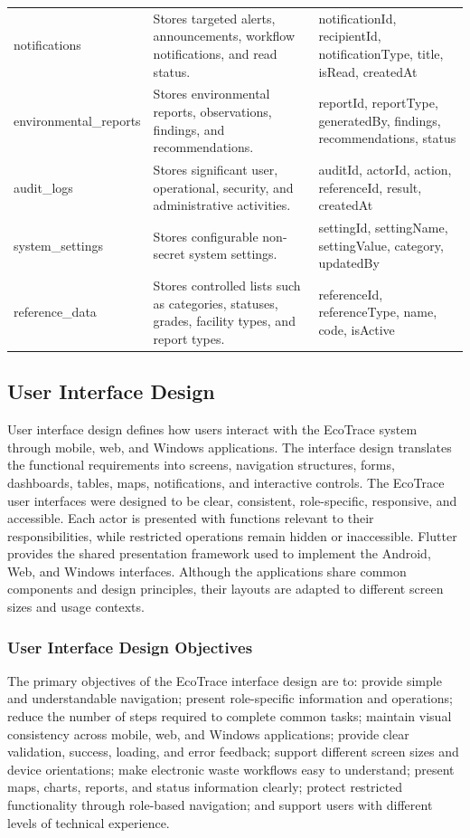 \begin{longtable}{@{}p{3.2cm}p{4.6cm}p{5.4cm}@{}}
notifications & Stores targeted alerts, announcements, workflow notifications, and read status. & notificationId, recipientId, notificationType, title, isRead, createdAt \\
environmental\_reports & Stores environmental reports, observations, findings, and recommendations. & reportId, reportType, generatedBy, findings, recommendations, status \\
audit\_logs & Stores significant user, operational, security, and administrative activities. & auditId, actorId, action, referenceId, result, createdAt \\
system\_settings & Stores configurable non-secret system settings. & settingId, settingName, settingValue, category, updatedBy \\
reference\_data & Stores controlled lists such as categories, statuses, grades, facility types, and report types. & referenceId, referenceType, name, code, isActive \\
\bottomrule
\end{longtable}

\subsection{User Interface Design}

User interface design defines how users interact with the EcoTrace system
through mobile, web, and Windows applications. The interface design
translates the functional requirements into screens, navigation structures,
forms, dashboards, tables, maps, notifications, and interactive controls. The
EcoTrace user interfaces were designed to be clear, consistent, role-specific,
responsive, and accessible. Each actor is presented with functions relevant to
their responsibilities, while restricted operations remain hidden or
inaccessible. Flutter provides the shared presentation framework used to
implement the Android, Web, and Windows interfaces. Although the
applications share common components and design principles, their layouts
are adapted to different screen sizes and usage contexts.

\subsubsection{User Interface Design Objectives}
The primary objectives of the EcoTrace interface design are to: provide
simple and understandable navigation; present role-specific information and
operations; reduce the number of steps required to complete common tasks;
maintain visual consistency across mobile, web, and Windows applications;
provide clear validation, success, loading, and error feedback; support
different screen sizes and device orientations; make electronic waste
workflows easy to understand; present maps, charts, reports, and status
information clearly; protect restricted functionality through role-based
navigation; and support users with different levels of technical experience.

